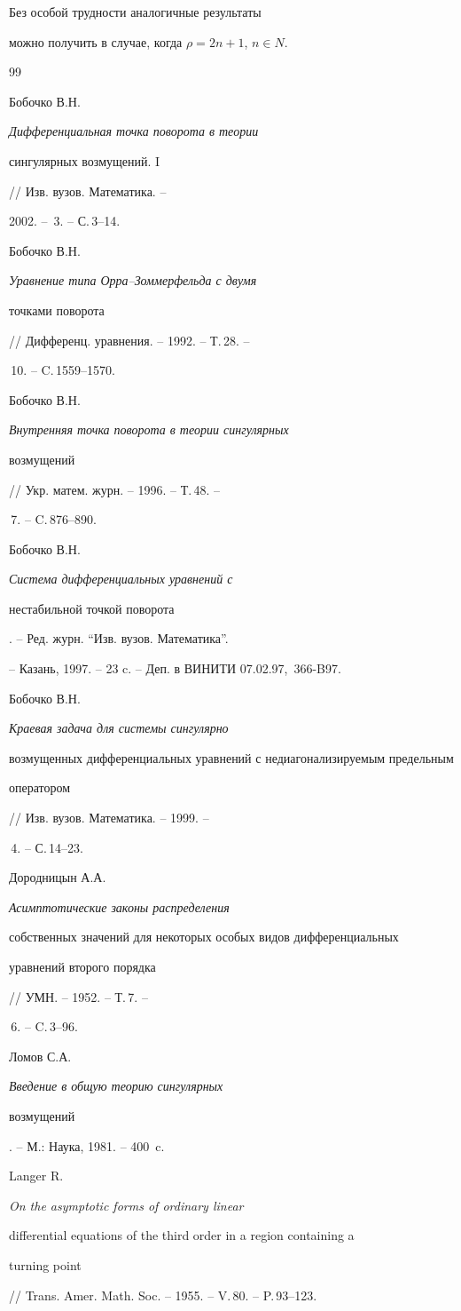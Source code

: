 \begin{note}


Без особой трудности аналогичные результаты


можно получить в случае, когда $ \rho = 2n + 1$, $n \in N$.


\end{note}








\begin{thebibliography}{99}





 Бобочко В.Н. {\it Дифференциальная точка поворота в теории


сингулярных возмущений. I} // Изв. вузов. Математика. --


2002. -- \No\,3. -- С.\,3--14.


 Бобочко В.Н. {\it Уравнение типа Орра--Зоммерфельда с двумя


точками поворота} // Дифференц. уравнения. -- 1992. -- Т.\,28. --


\No\,10. -- C.\,1559--1570.


 Бобочко В.Н. {\it Внутренняя точка поворота в теории сингулярных


возмущений} // Укр. матем. журн. -- 1996. -- Т.\,48. --


\No\,7. -- C.\,876--890.


 Бобочко В.Н. {\it Система дифференциальных уравнений с


нестабильной точкой поворота}. -- Ред. журн. ``Изв. вузов. Математика''.


-- Казань, 1997. -- 23 c. -- Деп. в ВИНИТИ 07.02.97, \No\,366-B97.


 Бобочко В.Н. {\it Краевая задача для системы сингулярно 


возмущенных дифференциальных уравнений с недиагонализируемым предельным


оператором} // Изв. вузов. Математика. -- 1999. --


\No\,4. -- С.\,14--23.


 Дородницын А.А. {\it Асимптотические законы распределения


собственных значений для некоторых особых видов дифференциальных


уравнений второго порядка} // УМН. -- 1952. -- Т.\,7. --


\No\,6. -- C.\,3--96.


 Ломов С.А. {\it Введение в общую теорию сингулярных


возмущений}. -- М.: Наука, 1981. -- 400~c.


 Langer R. {\it On the asymptotic forms of ordinary linear


differential equations of the third order in a region containing a


turning point} // Trans. Amer. Math. Soc. -- 1955. -- V.\,80. -- P.\,93--123.





\end{thebibliography}
